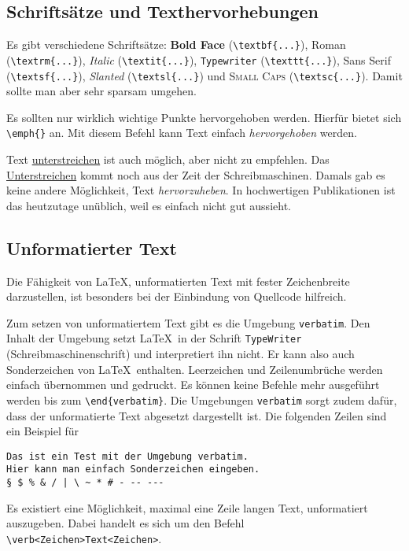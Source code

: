 \documentclass{llncs}
\begin{document}
\subsection{Schriftsätze und Texthervorhebungen}

Es gibt verschiedene Schriftsätze: \textbf{Bold Face} (\verb!\textbf{...}!), \textrm{Roman} (\verb!\textrm{...}!), \textit{Italic} (\verb!\textit{...}!), \texttt{Typewriter} (\verb!\texttt{...}!), \textsf{Sans Serif} (\verb!\textsf{...}!), \textsl{Slanted} (\verb!\textsl{...}!) und \textsc{Small Caps} (\verb!\textsc{...}!). Damit sollte man aber sehr sparsam umgehen.

Es sollten nur wirklich wichtige Punkte hervorgehoben werden. Hierfür bietet sich \verb!\emph{}! an. Mit diesem Befehl kann Text einfach \emph{hervorgehoben} werden.

Text \underline{unterstreichen} ist auch möglich, aber nicht zu empfehlen. Das \underline{Unterstreichen} kommt noch aus der Zeit der Schreibmaschinen. Damals gab es keine andere Möglichkeit, Text \emph{hervorzuheben}. In hochwertigen Publikationen ist das heutzutage unüblich, weil es einfach nicht gut aussieht.

\subsection{Unformatierter Text}
Die Fähigkeit von \LaTeX, unformatierten Text mit fester Zeichenbreite darzustellen, ist 
besonders bei der Einbindung von Quellcode hilfreich.

Zum setzen von unformatiertem Text gibt es die Umgebung \texttt{verbatim}. Den Inhalt der Umgebung setzt \LaTeX\ in der Schrift \texttt{TypeWriter} (Schreibmaschinenschrift) und interpretiert ihn nicht. Er kann also auch Sonderzeichen von \LaTeX\ enthalten. Leerzeichen und Zeilenumbrüche werden einfach übernommen und gedruckt. Es können keine Befehle mehr ausgeführt werden bis zum \verb!\end{verbatim}!. Die Umgebungen \texttt{verbatim} sorgt zudem dafür, dass der unformatierte Text abgesetzt dargestellt ist. Die folgenden Zeilen sind ein Beispiel für 

\begin{verbatim}
Das ist ein Test mit der Umgebung verbatim.
Hier kann man einfach Sonderzeichen eingeben.
§ $ % & / | \ ~ * # - -- ---
\end{verbatim}

Es existiert eine Möglichkeit, maximal eine Zeile langen Text, unformatiert auszugeben. Dabei handelt es sich um den Befehl \verb!\verb<Zeichen>Text<Zeichen>!.
\end{document}
